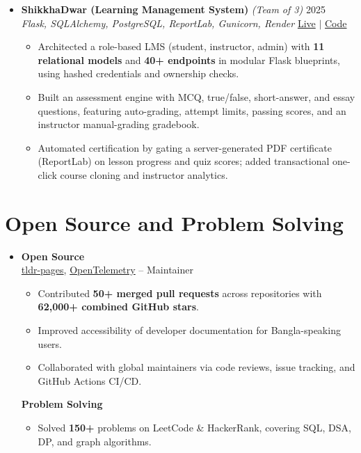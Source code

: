 \documentclass[a4paper]{article}
\newcommand{\resumeItem}[1]{
  \item\small{
    {#1 \vspace{-2pt}}
  }
}
\newcommand{\resumeItemListStart}{\begin{itemize}}
\newcommand{\resumeItemListEnd}{\end{itemize}\vspace{-5pt}}
\newcommand{\subheading}[1]{\noindent \textbf{#1} \\}
\begin{document}
\begin{itemize}[leftmargin=0.15in, label={}, itemsep=6pt]
    \item
    \textbf{ShikkhaDwar (Learning Management System)} \textit{\small (Team of 3)} \hfill 2025\\
    \small\textit{Flask, SQLAlchemy, PostgreSQL, ReportLab, Gunicorn, Render} \hfill
    \href{https://shikkhadwar-81r2.onrender.com/}{Live} $|$
    \href{https://github.com/nihal-kabir/ShikkhaDwar}{Code}
    \vspace{-5pt}
    \resumeItemListStart
      \resumeItem{Architected a role-based LMS (student, instructor, admin) with \textbf{11 relational models} and \textbf{40+ endpoints} in modular Flask blueprints, using hashed credentials and ownership checks.}
      \resumeItem{Built an assessment engine with MCQ, true/false, short-answer, and essay questions, featuring auto-grading, attempt limits, passing scores, and an instructor manual-grading gradebook.}
      \resumeItem{Automated certification by gating a server-generated PDF certificate (ReportLab) on lesson progress and quiz scores; added transactional one-click course cloning and instructor analytics.}
    \resumeItemListEnd

  \end{itemize}




\section{Open Source and Problem Solving}
\begin{itemize}[leftmargin=0.15in, label={}, parsep=0pt]
\item
\small
\subheading{Open Source}
\href{https://github.com/tldr-pages/tldr}{tldr-pages}, \href{https://github.com/open-telemetry}{OpenTelemetry} --
Maintainer
\begin{itemize}[noitemsep, topsep=0pt]
    \item Contributed \textbf{50+ merged pull requests} across repositories with \textbf{62,000+ combined GitHub stars}.
    \item Improved accessibility of developer documentation for Bangla-speaking users.
    \item Collaborated with global maintainers via code reviews, issue tracking, and GitHub Actions CI/CD.
\end{itemize}

\vspace{0.5em}

\subheading{Problem Solving}
\begin{itemize}[noitemsep, topsep=0pt, partopsep=0pt]
\item Solved \textbf{150+} problems on LeetCode \& HackerRank, covering SQL, DSA, DP, and graph algorithms.
\end{itemize}
\end{itemize}
\end{document}
